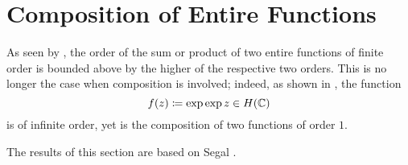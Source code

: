 \chapter{Composition of Entire Functions}
\label{ch:composition-entire-functions}

As seen by , the order of the sum or product of two entire functions of finite order is bounded above by the higher of the respective two orders. This is no longer the case when composition is involved; indeed, as shown in , the function
$$ f(z) \coloneqq \exp \exp z \in H(\mathbb{C}) $$
is of infinite order, yet is the composition of two functions of order $1$. 

The results of this section are based on Segal \cite{segal-complex-analysis}.

